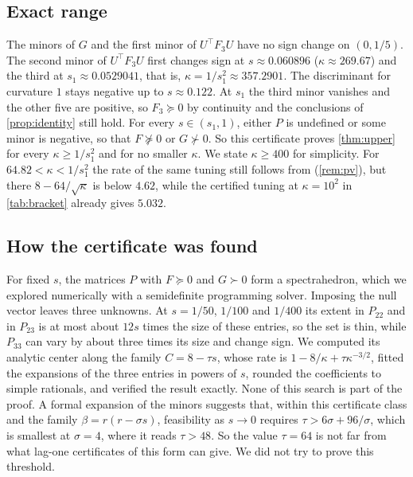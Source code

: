 \documentclass[11pt, a4paper]{article}
\theoremstyle{definition}
\begin{document}
\subsection{Exact range}
\label{sec:range}

The minors of $G$ and the first minor of $U^\top F_3U$ have no sign change on $(0,1/5)$. The second minor of
$U^\top F_3U$ first changes sign at $s\approx0.060896$ ($\kappa\approx269.67$) and the third at $s_1\approx0.0529041$, that is,
$\kappa=1/s_1^2\approx357.2901$. The discriminant for curvature $1$ stays negative up to $s\approx0.122$. At $s_1$ the
third minor vanishes and the other five are positive, so $F_3\succeq0$ by continuity and the conclusions of
\cref{prop:identity} still hold. For every $s\in(s_1,1)$, either $P$ is undefined or some minor is negative, so that
$F\not\succeq0$ or $G\not\succ0$. So this certificate proves \cref{thm:upper} for every $\kappa\ge1/s_1^2$ and for no
smaller $\kappa$. We state $\kappa\ge400$ for simplicity. For $64.82<\kappa<1/s_1^2$ the rate of the same tuning still
follows from \citet{pasechniuk2026two} (\cref{rem:pv}), but there $8-64/\sqrt\kappa$ is below $4.62$, while the
certified tuning at $\kappa=10^2$ in \cref{tab:bracket} already gives $5.032$.

\subsection{How the certificate was found}
\label{sec:found}

For fixed $s$, the matrices $P$ with $F\succeq0$ and $G\succ0$ form a spectrahedron, which we explored numerically with
a semidefinite programming solver. Imposing the null vector leaves three unknowns. At $s=1/50$, $1/100$ and $1/400$ its
extent in $P_{22}$ and in $P_{23}$ is at most about $12s$ times the size of these entries, so the set is thin, while
$P_{33}$ can vary by about three times its size and change sign. We computed its analytic center along the family
$C=8-\tau s$, whose rate is $1-8/\kappa+\tau\kappa^{-3/2}$, fitted the expansions of the three entries in powers of $s$, rounded the coefficients to simple rationals,
and verified the result exactly. None of this search is part of the proof. A formal expansion of the minors suggests
that, within this certificate class and the family $\beta=r(r-\sigma s)$, feasibility as $s\to0$ requires
$\tau>6\sigma+96/\sigma$, which is smallest at $\sigma=4$, where it reads $\tau>48$. So the value $\tau=64$ is not far from
what lag-one certificates of this form can give. We did not try to prove this threshold.
\end{document}
